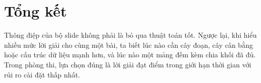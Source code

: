\documentclass[11pt]{article}
\begin{document}
\section{Tổng kết}

Thông điệp của bộ slide không phải là bỏ qua thuật toán tốt. Ngược lại, khi
hiểu nhiều mức lời giải cho cùng một bài, ta biết lúc nào cần cây đoạn, cây
cân bằng hoặc cấu trúc dữ liệu mạnh hơn, và lúc nào một mảng đếm kèm chia
khối đã đủ. Trong phòng thi, lựa chọn đúng là lời giải đạt điểm trong giới
hạn thời gian với rủi ro cài đặt thấp nhất.
\end{document}
